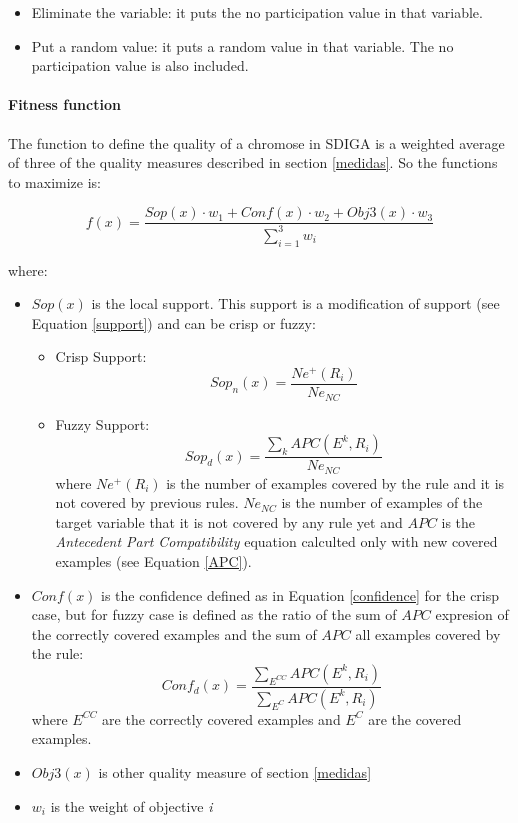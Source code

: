 \documentclass[]{article}
\begin{document}
\begin{itemize}
\item Eliminate the variable: it puts the no participation value in that variable.
\item Put a random value: it puts a random value in that variable. The no participation value is also included.
\end{itemize}

\paragraph{Fitness function}\label{fitness-function}

The function to define the quality of a chromose in SDIGA is a weighted
average of three of the quality measures described in section
\ref{medidas}. So the functions to maximize is:

\begin{equation} f(x) = \frac{Sop(x) \cdot  w_1 + Conf(x) \cdot w_2 + Obj3(x) \cdot  w_3}{\sum_{i=1}^{3} w_i} \label{fitnessSDIGA} \end{equation}

where:

\begin{itemize}
 \item $Sop(x)$ is the local support. This support is a modification of support (see Equation \ref{support}) and can be crisp or fuzzy: 
    \begin{itemize}
      \item Crisp Support: \begin{equation} Sop_n(x) = \frac{Ne^+(R_i)}{Ne_{NC}} \end{equation}
      \item Fuzzy Support: \begin{equation} Sop_d(x) = \frac{\sum_{k} APC(E^k, R_i)}{Ne_{NC}} \end{equation}
      where $Ne^+(R_i)$ is the number of examples covered by the rule and it is not covered by previous rules. $Ne_{NC}$ is the number of examples of the target variable that it is not covered by any rule yet and $APC$ is the \textit{Antecedent Part Compatibility} equation calculted only with new covered examples (see Equation \ref{APC}).
    \end{itemize}
    
    \item $Conf(x)$ is the confidence defined as in Equation \ref{confidence} for the crisp case, but for fuzzy case is defined as the ratio of the sum of $APC$ expresion of the correctly covered examples and the sum of $APC$ all examples covered by the rule: \begin{equation} Conf_d(x) = \frac{\sum_{E^{CC}} APC(E^k, R_i)}{\sum_{E^{C}} APC(E^k, R_i)} \end{equation} where $E^{CC}$ are the correctly covered examples and $E^C$ are the covered examples.
    
    \item $Obj3(x)$ is other quality measure of section \ref{medidas}
    \item $w_i$ is the weight of objective \textit{i}
\end{itemize}
\end{document}
